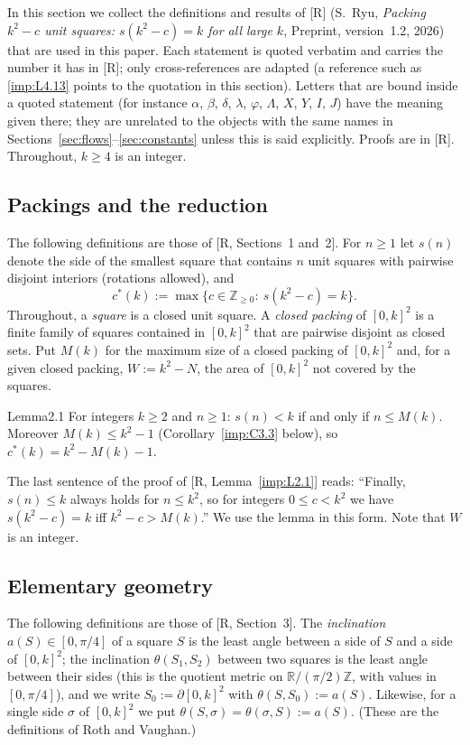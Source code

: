 \documentclass[11pt]{amsart}
\newcommand{\R}{\mathbb R}
\newcommand{\Z}{\mathbb Z}
\theoremstyle{definition}
\theoremstyle{remark}
\numberwithin{equation}{section}
\begin{document}
In this section we collect the definitions and results of
[R] (S.~Ryu, \emph{Packing $k^2-c$ unit squares: $s(k^2-c)=k$ for all large $k$}, Preprint, version~1.2, 2026)
that are used in this paper. Each statement is quoted verbatim and carries the number it has in [R]; only
cross-references are adapted (a reference such as \ref{imp:L4.13} points to the quotation in this section).
Letters that are bound inside a quoted statement (for instance $\alpha$, $\beta$, $\delta$, $\lambda$, $\varphi$,
$\Lambda$, $X$, $Y$, $I$, $J$) have the meaning given there; they are unrelated to the objects with the same
names in Sections~\ref{sec:flows}--\ref{sec:constants} unless this is said explicitly. Proofs are in [R].
Throughout, $k\ge4$ is an integer.

\subsection{Packings and the reduction}

The following definitions are those of [R, Sections~1 and~2].
For $n\ge 1$ let $s(n)$ denote the side of the smallest square that contains $n$ unit squares with pairwise
disjoint interiors (rotations allowed), and
\[
c^*(k):=\max\{c\in\Z_{\ge0}:\ s(k^2-c)=k\}.
\]
Throughout, a \emph{square} is a closed unit square. A \emph{closed packing} of $[0,k]^2$ is a finite family of squares
contained in $[0,k]^2$ that are pairwise disjoint as closed sets. Put $M(k)$ for the maximum size of a closed packing
of $[0,k]^2$ and, for a given closed packing, $W:=k^2-N$, the area of $[0,k]^2$ not covered by the squares.

\begin{ImpStatement}{Lemma}{2.1}\label{imp:L2.1}
For integers $k\ge 2$ and $n\ge 1$: $s(n)<k$ if and only if $n\le M(k)$. Moreover $M(k)\le k^2-1$
\textup{(}Corollary~\ref{imp:C3.3} below\textup{)}, so $c^*(k)=k^2-M(k)-1$.
\end{ImpStatement}

The last sentence of the proof of [R, Lemma~\ref{imp:L2.1}] reads: ``Finally, $s(n)\le k$ always holds for
$n\le k^2$, so for integers $0\le c<k^2$ we have $s(k^2-c)=k$ iff $k^2-c>M(k)$.'' We use the lemma in this
form. Note that $W$ is an integer.

\subsection{Elementary geometry}

The following definitions are those of [R, Section~3].
The \emph{inclination} $a(S)\in[0,\pi/4]$ of a square $S$ is the least angle between a side of $S$ and a side of
$[0,k]^2$; the inclination $\theta(S_1,S_2)$ between two squares is the least angle between their sides
(this is the quotient metric on $\R/(\pi/2)\Z$, with values in $[0,\pi/4]$), and we write $S_0:=\partial[0,k]^2$ with
$\theta(S,S_0):=a(S)$. Likewise, for a single side $\sigma$ of $[0,k]^2$ we put
$\theta(S,\sigma)=\theta(\sigma,S):=a(S)$. (These are the definitions of Roth and Vaughan.)
\end{document}
